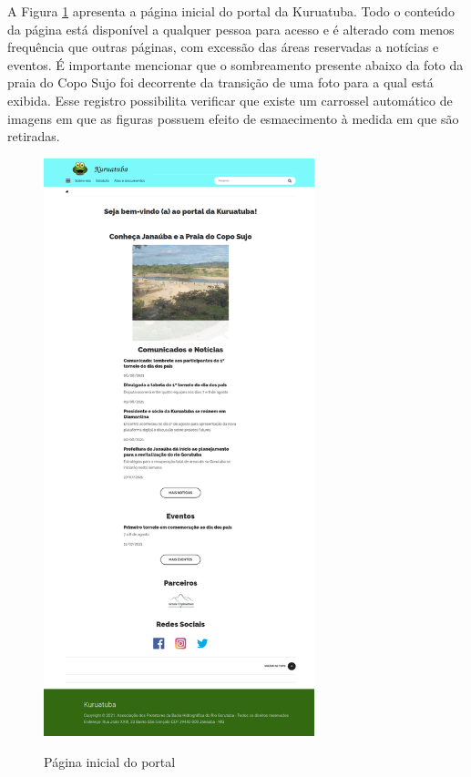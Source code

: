 A Figura \ref{fig:home-portal} apresenta a página inicial do portal da Kuruatuba. Todo o conteúdo da página está disponível a qualquer pessoa para acesso e é alterado com menos frequência que outras páginas, com excessão das áreas reservadas a notícias e eventos. É importante mencionar que o sombreamento presente abaixo da foto da praia do Copo Sujo foi decorrente da transição de uma foto para a qual está exibida. Esse registro possibilita verificar que existe um carrossel automático de imagens em que as figuras possuem efeito de esmaecimento à medida em que são retiradas.

\clearpage
\newpage

\begin{figure}[htb]
 \centering
 \caption{Página inicial do portal}
 \includegraphics[width=0.7\textwidth]{figuras/kuruatuba_portal_home.png}
 \label{fig:home-portal}
\end{figure}

